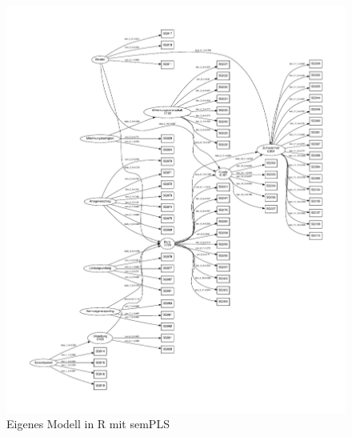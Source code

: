 \documentclass{article}\usepackage[]{graphicx}\usepackage[]{color}
\begin{document}
\begin{figure}[h!]
\centering
\hspace*{-3cm}\vspace*{-0.5cm}\includegraphics[scale=1]{PB-structure-final.pdf}
\caption{Eigenes Modell in R mit semPLS}
\label{final_model}
\end{figure}

\clearpage
\end{document}
